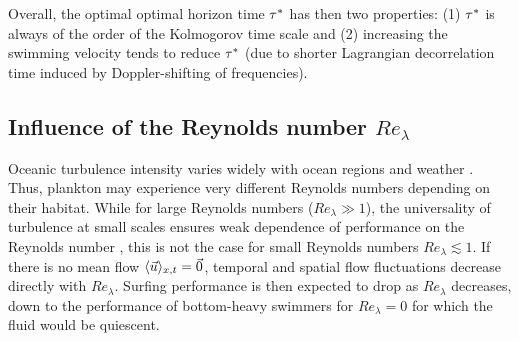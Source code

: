 Overall, the optimal optimal horizon time $\tau^*$ has then two properties: (1) $\tau^*$ is always of the order of the Kolmogorov time scale and (2) increasing the swimming velocity tends to reduce $\tau^*$ (due to shorter Lagrangian decorrelation time induced by Doppler-shifting of frequencies).

\subsection{Influence of the Reynolds number $\mathit{Re}_{\lambda}$}

Oceanic turbulence intensity varies widely with ocean regions and weather \citep{fuchs2016seascape}.
Thus, plankton may experience very different Reynolds numbers depending on their habitat.
While for large Reynolds numbers ($\mathit{Re}_{\lambda} \gg 1$), the universality of turbulence at small scales ensures weak dependence of performance on the Reynolds number \citep{frisch1995turbulence}, this is not the case for small Reynolds numbers $\mathit{Re}_{\lambda} \lesssim 1$.
If there is no mean flow $\langle \vec{u} \rangle_{x,t} = \vec{0}$, temporal and spatial flow fluctuations decrease directly with $\mathit{Re}_{\lambda}$. 
Surfing performance is then expected to drop as $\mathit{Re}_{\lambda}$ decreases, down to the performance of bottom-heavy swimmers for $\mathit{Re}_{\lambda} = 0$ for which the fluid would be quiescent.

